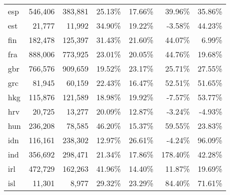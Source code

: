 \documentclass[11pt,a4paper]{article}
\begin{document}
\begin{table}[h]
\begin{tabular}{lrrrrrr}
    esp   & 546,406 & 383,881 & 25.13\% & 17.66\% & 39.96\% & 35.86\% \\
    est   & 21,777 & 11,992 & 34.90\% & 19.22\% & -3.58\% & 44.23\% \\
    fin   & 182,478 & 125,397 & 31.43\% & 21.60\% & 44.07\% & 6.99\% \\
    fra   & 888,006 & 773,925 & 23.01\% & 20.05\% & 44.76\% & 19.68\% \\
    gbr   & 766,576 & 909,659 & 19.52\% & 23.17\% & 25.71\% & 27.55\% \\
    grc   & 81,945 & 60,159 & 22.43\% & 16.47\% & 52.51\% & 51.65\% \\
    hkg   & 115,876 & 121,589 & 18.98\% & 19.92\% & -7.57\% & 53.77\% \\
    hrv   & 20,725 & 13,277 & 20.09\% & 12.87\% & -3.24\% & -4.93\% \\
    hun   & 236,208 & 78,585 & 46.20\% & 15.37\% & 59.55\% & 23.83\% \\
    idn   & 116,161 & 238,302 & 12.97\% & 26.61\% & -4.24\% & 96.09\% \\
    ind   & 356,692 & 298,471 & 21.34\% & 17.86\% & 178.40\% & 42.28\% \\
    irl   & 472,729 & 162,263 & 41.96\% & 14.40\% & 11.87\% & 19.69\% \\
    isl   & 11,301 & 8,977 & 29.32\% & 23.29\% & 84.40\% & 71.61\% \\
    \end{tabular}
\end{table}
\end{document}
